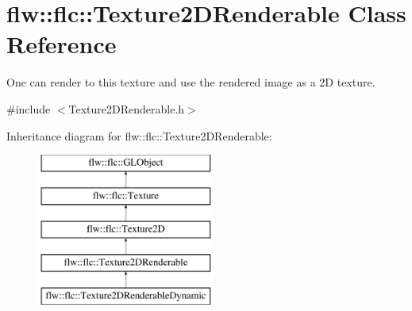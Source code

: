 \hypertarget{classflw_1_1flc_1_1Texture2DRenderable}{}\section{flw\+:\+:flc\+:\+:Texture2\+D\+Renderable Class Reference}
\label{classflw_1_1flc_1_1Texture2DRenderable}


One can render to this texture and use the rendered image as a 2D texture.  




{\ttfamily \#include $<$Texture2\+D\+Renderable.\+h$>$}

Inheritance diagram for flw\+:\+:flc\+:\+:Texture2\+D\+Renderable\+:\begin{figure}[H]
\begin{center}
\leavevmode
\includegraphics[height=5.000000cm]{classflw_1_1flc_1_1Texture2DRenderable}
\end{center}
\end{figure}
